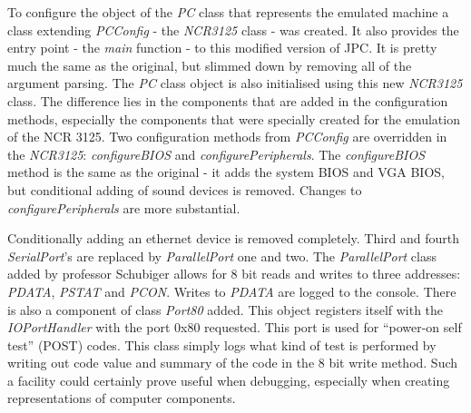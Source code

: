 To configure the object of the \emph{PC} class that represents the emulated
machine a class extending \emph{PCConfig} - the \emph{NCR3125} class -  was
created. It also provides the entry point - the \emph{main} function - to this
modified version of JPC. It is pretty much the same as the original, but
slimmed down by removing all of the argument parsing. The \emph{PC} class
object is also initialised using this new \emph{NCR3125} class. The difference
lies in the components that are added in the configuration methods, especially
the components that were specially created for the emulation of the NCR 3125.
Two configuration methods from \emph{PCConfig} are overridden in the
\emph{NCR3125}: \emph{configureBIOS} and \emph{configurePeripherals}. The
\emph{configureBIOS} method is the same as the original - it adds the system
BIOS and VGA BIOS, but conditional adding of sound devices is removed. Changes
to \emph{configurePeripherals} are more substantial.

\begin{codeblock}
    
\end{codeblock}


Conditionally adding an ethernet device is removed completely. Third and fourth
\emph{SerialPort}'s are replaced by \emph{ParallelPort} one and two. The
\emph{ParallelPort} class added by professor Schubiger allows for 8 bit reads
and writes to three addresses: \emph{PDATA}, \emph{PSTAT} and \emph{PCON}.
Writes to \emph{PDATA} are logged to the console. There is also a component of
class \emph{Port80} added. This object registers itself with the
\emph{IOPortHandler} with the port 0x80 requested. This port is used for
``power-on self test'' (POST) codes. This class simply logs what kind of test is
performed by writing out code value and summary of the code in the 8 bit write
method. Such a facility could certainly prove useful when debugging, especially
when creating representations of computer components. 

